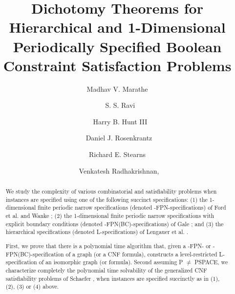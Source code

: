 \documentclass{svproc}
\newcounter{program}
\begin{document}
\title{Dichotomy Theorems for Hierarchical and 1-Dimensional Periodically Specified Boolean Constraint Satisfaction Problems}

\author{ Madhav V. Marathe 
       \and{~} S. S. Ravi
       \and{~} Harry B. Hunt III
       \and  {~}Daniel J. Rosenkrantz
        \and {\newline}  Richard E. Stearns
        \and {~}Venkatesh Radhakrishnan,   %
}


\maketitle



\begin{abstract}
We study the complexity of various combinatorial and satisfiability problems
when instances are specified using one of the following succinct 
specifications:
(1) the 1-dimensional finite periodic narrow specifications (denoted 
{-FPN}-specifications)  of  
 Ford  et al. and Wanke \cite{FF58,Wa93};
(2) the 1-dimensional finite periodic narrow specifications with explicit
boundary conditions (denoted 
{-FPN(BC)}-specifications) of Gale \cite{Ga59}; 
and  
(3) the hierarchical specifications (denoted {\sf L}-specifications)
 of Lengauer et al. \cite{LW87a}.


First, we prove that there is a polynomial time algorithm that,
given a {-FPN}- or {-FPN(BC)}-specification of a graph 
(or a {\sf CNF} formula), constructs a level-restricted {\sf L}-specification
of an isomorphic graph (or formula). Second assuming {\sf P} $\neq$
 {\sf PSPACE},  we characterize completely the polynomial time 
solvability of the generalized {\sf CNF} satisfiability problems of 
Schaefer \cite{Sc78}, when instances are specified succinctly
as in (1), (2), (3) or (4) above.
\end{abstract}
\end{document}

